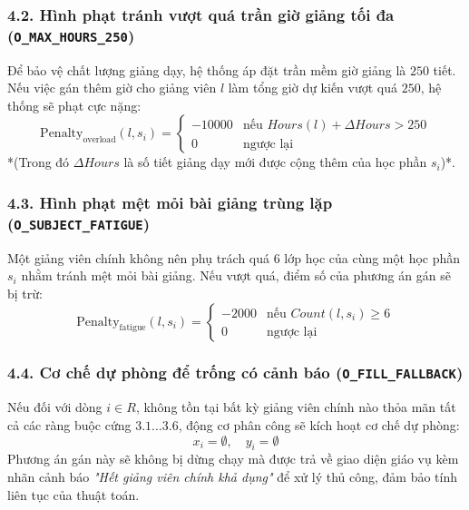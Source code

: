 \documentclass{article}
\begin{document}
\subsubsection*{4.2. Hình phạt tránh vượt quá trần giờ giảng tối đa (\texttt{O\_MAX\_HOURS\_250})}
Để bảo vệ chất lượng giảng dạy, hệ thống áp đặt trần mềm giờ giảng là $250$ tiết. Nếu việc gán thêm giờ cho giảng viên $l$ làm tổng giờ dự kiến vượt quá $250$, hệ thống sẽ phạt cực nặng:
\[
\text{Penalty}_{\text{overload}}(l, s_i) = \begin{cases} -10000 & \text{nếu } Hours(l) + \Delta Hours > 250 \\ 0 & \text{ngược lại} \end{cases}
\]
*(Trong đó $\Delta Hours$ là số tiết giảng dạy mới được cộng thêm của học phần $s_i$)*.

\subsubsection*{4.3. Hình phạt mệt mỏi bài giảng trùng lặp (\texttt{O\_SUBJECT\_FATIGUE})}
Một giảng viên chính không nên phụ trách quá $6$ lớp học của cùng một học phần $s_i$ nhằm tránh mệt mỏi bài giảng. Nếu vượt quá, điểm số của phương án gán sẽ bị trừ:
\[
\text{Penalty}_{\text{fatigue}}(l, s_i) = \begin{cases} -2000 & \text{nếu } Count(l, s_i) \ge 6 \\ 0 & \text{ngược lại} \end{cases}
\]

\subsubsection*{4.4. Cơ chế dự phòng để trống có cảnh báo (\texttt{O\_FILL\_FALLBACK})}
Nếu đối với dòng $i \in R$, không tồn tại bất kỳ giảng viên chính nào thỏa mãn tất cả các ràng buộc cứng $3.1 \dots 3.6$, động cơ phân công sẽ kích hoạt cơ chế dự phòng:
\[
x_i = \emptyset, \quad y_i = \emptyset
\]
Phương án gán này sẽ không bị dừng chạy mà được trả về giao diện giáo vụ kèm nhãn cảnh báo \textit{"Hết giảng viên chính khả dụng"} để xử lý thủ công, đảm bảo tính liên tục của thuật toán.
\end{document}
